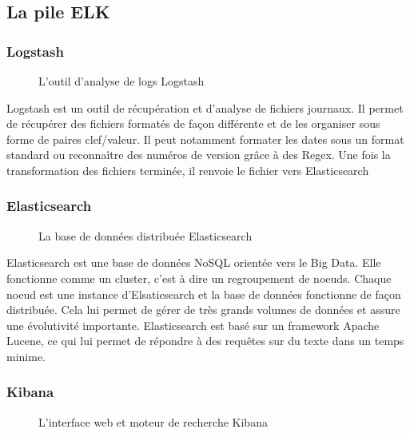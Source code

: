 \subsection{La pile ELK}
\subsubsection{Logstash}

\begin{figure}[!h]
\centering
\def\svgwidth{0.2\columnwidth}

\caption{L'outil d'analyse de logs Logstash}
\label{logstash}
\end{figure}

Logstash est un outil de récupération et d'analyse de fichiers journaux. Il permet de récupérer des fichiers formatés de façon différente et de les organiser sous forme de paires clef/valeur. Il peut notamment formater les dates sous un format standard ou reconnaître des numéros de version grâce à des Regex. Une fois la transformation des fichiers terminée, il renvoie le fichier vers Elasticsearch

\subsubsection{Elasticsearch}

\begin{figure}[!h]
\centering
\def\svgwidth{0.2\columnwidth}

\caption{La base de données distribuée Elasticsearch}
\label{elasticsearch}
\end{figure}

Elasticsearch est une base de données NoSQL orientée vers le Big Data. Elle fonctionne comme un cluster, c'est à dire un regroupement de noeuds. Chaque noeud est une instance d'Elsaticsearch et la base de données fonctionne de façon distribuée. Cela lui permet de gérer de très grands volumes de données et assure une évolutivité importante. Elasticsearch est basé sur un framework Apache Lucene, ce qui lui permet de répondre à des requêtes sur du texte dans un temps minime.

\subsubsection{Kibana}

\begin{figure}[!h]
\centering
\def\svgwidth{0.2\columnwidth}

\caption{L'interface web et moteur de recherche Kibana}
\label{kibana}
\end{figure}


